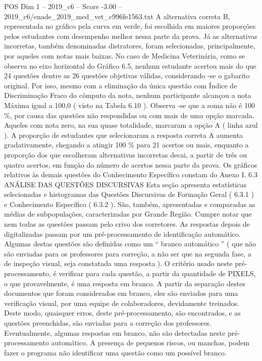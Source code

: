 \begin{textsample}{POS Dim 1 – 2019\_c6 – Score -3.00 – 2019\_c6/enade\_2019\_med\_vet\_c996fe1563.txt}
A alternativa correta B, representada no gráfico pela curva em verde, foi escolhida em maiores proporções pelos estudantes com desempenho melhor nessa parte da prova.
Já as alternativas incorretas, também denominadas distratores, foram selecionadas, principalmente, por aqueles com notas mais baixas.
No caso de Medicina Veterinária, como se observa no eixo horizontal do Gráfico 6.5, nenhum estudante acertou mais do que 24 questões dentre as 26 questões objetivas válidas, considerando -se o gabarito original.
Por isso, mesmo com a eliminação da única questão com Índice de Discriminação Fraco do cômputo da nota, nenhum participante alcançou a nota Máxima igual a 100,0 ( visto na Tabela 6.10 ).
Observa -se que a soma não é 100 \%, por causa das questões não respondidas ou com mais de uma opção marcada.
Aqueles com nota zero, na sua quase totalidade, marcaram a opção A ( linha azul ).
A proporção de estudantes que selecionaram a resposta correta A aumenta gradativamente, chegando a atingir 100 \% para 21 acertos ou mais, enquanto a proporção dos que escolheram alternativas incorretas decai, a partir de três ou quatro acertos, em função do número de acertos nessa parte da prova.
Os gráficos relativos às demais questões do Conhecimento Específico constam do Anexo I. 6.3 ANÁLISE DAS QUESTÕES DISCURSIVAS Esta seção apresenta estatísticas selecionadas e histogramas das Questões Discursivas de Formação Geral ( 6.3.1 ) e Conhecimento Específico ( 6.3.2 ).
São, também, apresentadas e comparadas as médias de subpopulações, caracterizadas por Grande Região.
Cumpre notar que nem todas as questões passam pelo crivo dos corretores.
As respostas depois de digitalizadas passam por um pré-processamento de identificação automático.
Algumas destas questões são definidas como um “ branco automático ” ( que não são enviadas para os professores para correção, a não ser que na segunda fase, a de inspeção visual, seja constatada uma resposta ).
O critério usado neste pré-processamento, é verificar para cada questão, a partir da quantidade de PIXELS, o que provavelmente, é uma resposta em branco.
A partir da separação destes documentos que foram considerados em branco, eles são enviados para uma verificação visual, por uma equipe de colaboradores, devidamente treinados.
Deste modo, quaisquer erros, deste pré-processamento, são encontrados, e as questões preenchidas, são enviadas para a correção dos professores.
Eventualmente, algumas respostas em branco, não são detectadas neste pré-processamento automático.
A presença de pequenos riscos, ou manchas, podem fazer o programa não identificar uma questão como um possível branco.

\end{textsample}
